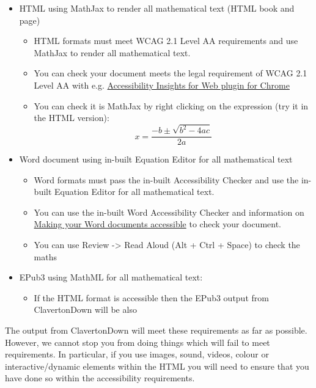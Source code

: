 \documentclass[10pt,english,a4paper]{article}
\providecommand{\tightlist}{%
  \setlength{\itemsep}{0pt}\setlength{\parskip}{0pt}}
\theoremstyle{plain}
\theoremstyle{plain}
\theoremstyle{plain}
\theoremstyle{plain}
\theoremstyle{plain}
\theoremstyle{definition}
\theoremstyle{definition}
\theoremstyle{definition}
\theoremstyle{remark}
\theoremstyle{remark}
\begin{document}
\begin{itemize}
\tightlist
\item
  HTML using MathJax to render all mathematical text (HTML book and page)

  \begin{itemize}
  \tightlist
  \item
    HTML formats must meet WCAG 2.1 Level AA requirements and use MathJax to render all mathematical text.
  \item
    You can check your document meets the legal requirement of WCAG 2.1 Level AA with e.g. \href{https://accessibilityinsights.io/docs/en/web/overview}{Accessibility Insights for Web plugin for Chrome}
  \item
    You can check it is MathJax by right clicking on the expression (try it in the HTML version):
    \[x = \frac{-b\pm\sqrt{b^2 - 4ac}}{2a}\]
  \end{itemize}
\item
  Word document using in-built Equation Editor for all mathematical text

  \begin{itemize}
  \tightlist
  \item
    Word formats must pass the in-built Accessibility Checker and use the in-built Equation Editor for all mathematical text.
  \item
    You can use the in-built Word Accessibility Checker and information on \href{https://support.office.com/en-gb/article/make-your-word-documents-accessible-to-people-with-disabilities-d9bf3683-87ac-47ea-b91a-78dcacb3c66d}{Making your Word documents accessible} to check your document.
  \item
    You can use Review -\textgreater{} Read Aloud (Alt + Ctrl + Space) to check the maths
  \end{itemize}
\item
  EPub3 using MathML for all mathematical text:

  \begin{itemize}
  \tightlist
  \item
    If the HTML format is accessible then the EPub3 output from ClavertonDown will be also
  \end{itemize}
\end{itemize}

The output from ClavertonDown will meet these requirements as far as possible. However, we cannot stop you from doing things which will fail to meet requirements. In particular, if you use images, sound, videos, colour or interactive/dynamic elements within the HTML you will need to ensure that you have done so within the accessibility requirements.
\end{document}
